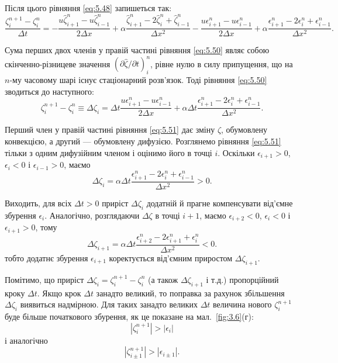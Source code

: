 Після цього рівняння \eqref{eq:5.48} запишеться так:
\begin{equation}
    \label{eq:5.50}
    \frac{\zeta_i^{n + 1} - \zeta_i^n}{\Delta t} = - \frac{u \hat{\zeta}_{i + 1}^n - u \hat{\zeta}_{i - 1}^n}{2 \Delta x} + \alpha \frac{\hat{\zeta}_{i + 1}^n - 2 \hat{\zeta}_i^n + \hat{\zeta}_{i - 1}^n}{\Delta x^2} - \frac{u \epsilon_{i + 1}^n - u \epsilon_{i - 1}^n}{2 \Delta x} + \alpha \frac{\epsilon_{i + 1}^n - 2 \epsilon_i^n + \epsilon_{i - 1}^n}{\Delta x^2}.
\end{equation}

Сума перших двох членів у правій частині рівняння \eqref{eq:5.50} являє собою скінченно-різницеве значення $(\partial \hat{\zeta} / \partial t)_i^n$, рівне нулю в силу припущення, що на $n$-му часовому шарі існує стаціонарний розв'язок. Тоді рівняння \eqref{eq:5.50} зводиться до наступного:
\begin{equation}
    \label{eq:5.51}
    \zeta_i^{n + 1} - \zeta_i^n \equiv \Delta \zeta_i = \Delta t \frac{u \epsilon_{i + 1}^n - u \epsilon_{i - 1}^n}{2 \Delta x} + \alpha \Delta t \frac{\epsilon_{i + 1}^n - 2 \epsilon_i^n + \epsilon_{i - 1}^n}{\Delta x^2}.
\end{equation}

Перший член у правій частині рівняння \eqref{eq:5.51} дає зміну $\zeta$, обумовлену конвекцією, а другий --- обумовлену дифузією.
Розглянемо рівняння \eqref{eq:5.51} тільки з одним дифузійним членом і оцінимо його в точці $i$. Оскільки $\epsilon_{i + 1} > 0$, $\epsilon_i < 0$ і $\epsilon_{i - 1} > 0$, маємо
\begin{equation}
    \label{eq:5.52}
    \Delta \zeta_i = \alpha \Delta t \frac{\epsilon_{i + 1}^n - 2 \epsilon_i^n + \epsilon_{i - 1}^n}{\Delta x^2} > 0.
\end{equation}

Виходить, для всіх $\Delta t > 0$ приріст $\Delta \zeta_i$ додатній й прагне компенсувати від'ємне збурення $\epsilon_i$.
Аналогічно, розглядаючи $\Delta \zeta$ в точці $i + 1$, маємо $\epsilon_{i + 2} < 0$, $\epsilon_i < 0$ і $\epsilon_{i + 1} > 0$, тому
\begin{equation}
    \label{eq:5.53}
    \Delta \zeta_{i + 1} = \alpha \Delta t \frac{\epsilon_{i + 2}^n - 2 \epsilon_{i + 1}^n + \epsilon_i^n}{\Delta x^2} < 0.
\end{equation}
тобто додатнє збурення $\epsilon_{i + 1}$ коректується від'ємним приростом $\Delta \zeta_{i + 1}$. \medskip

Помітимо, що приріст $\Delta \zeta_i = \zeta_i^{n + 1} - \zeta_i^n$ (а також $\Delta \zeta_{i + 1}$ і т.д.) пропорційний кроку $\Delta t$. Якщо крок $\Delta t$ занадто великий, то поправка за рахунок збільшення $\Delta \zeta_i$  виявиться надмірною. Для таких занадто великих $\Delta t$ величина нового $\zeta_i^{n + 1}$ буде більше початкового збурення, як це показане на мал.~\ref{fig:3.6}(г):
\begin{equation}
    \label{eq:5.54}
    |\zeta_i^{n + 1}| > |\epsilon_i|
\end{equation}
і аналогічно
\begin{equation}
    \label{eq:5.55}
    |\zeta_{i \pm 1}^{n + 1}| > |\epsilon_{i \pm 1}|.
\end{equation}

